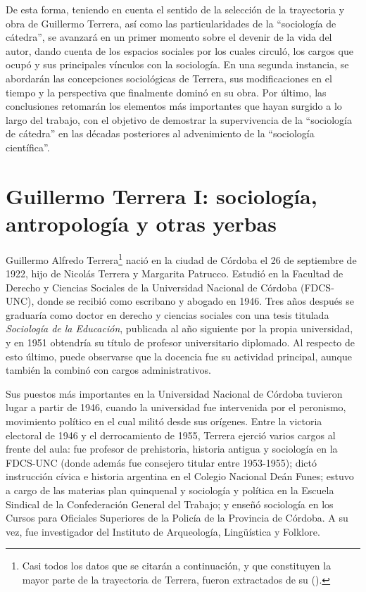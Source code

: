 De esta forma, teniendo en cuenta el sentido de la selección de la trayectoria y obra de Guillermo Terrera, así como las particularidades de la \enquote{sociología de cátedra}, se avanzará en un primer momento sobre el devenir de la vida del autor, dando cuenta de los espacios sociales por los cuales circuló, los cargos que ocupó y sus principales vínculos con la sociología. En una segunda instancia, se abordarán las concepciones sociológicas de Terrera, sus modificaciones en el tiempo y la perspectiva que finalmente dominó en su obra. Por último, las conclusiones retomarán los elementos más importantes que hayan surgido a lo largo del trabajo, con el objetivo de demostrar la supervivencia de la \enquote{sociología de cátedra} en las décadas posteriores al advenimiento de la \enquote{sociología científica}.

\section{Guillermo Terrera I: sociología, antropología y otras yerbas}

Guillermo Alfredo Terrera\footnote{Casi todos los datos que se citarán a continuación, y que constituyen la mayor parte de la trayectoria de Terrera, fueron extractados de su  (\citeyear{1710-TERRERA1974}).} nació en la ciudad de Córdoba el 26 de septiembre de 1922, hijo de Nicolás Terrera y Margarita Patrucco. Estudió en la Facultad de Derecho y Ciencias Sociales de la Universidad Nacional de Córdoba (FDCS-UNC), donde se recibió como escribano y abogado en 1946. Tres años después se graduaría como doctor en derecho y ciencias sociales con una tesis titulada \emph{Sociología de la Educación}, publicada al año siguiente por la propia universidad, y en 1951 obtendría su título de profesor universitario diplomado. Al respecto de esto último, puede observarse que la docencia fue su actividad principal, aunque también la combinó con cargos administrativos.

Sus puestos más importantes en la Universidad Nacional de Córdoba tuvieron lugar a partir de 1946, cuando la universidad fue intervenida por el peronismo, movimiento político en el cual militó desde sus orígenes. Entre la victoria electoral de 1946 y el derrocamiento de 1955, Terrera ejerció varios cargos al frente del aula: fue profesor de prehistoria, historia antigua y sociología en la FDCS-UNC (donde además fue consejero titular entre 1953-1955); dictó instrucción cívica e historia argentina en el Colegio Nacional Deán Funes; estuvo a cargo de las materias plan quinquenal y sociología y política en la Escuela Sindical de la Confederación General del Trabajo; y enseñó sociología en los Cursos para Oficiales Superiores de la Policía de la Provincia de Córdoba. A su vez, fue investigador del Instituto de Arqueología, Lingüística y Folklore.

